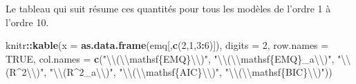 \documentclass[
]{book}
\newenvironment{Shaded}{\begin{snugshade}}{\end{snugshade}}
\newcommand{\CharTok}[1]{\textcolor[rgb]{0.31,0.60,0.02}{#1}}
\newcommand{\DataTypeTok}[1]{\textcolor[rgb]{0.13,0.29,0.53}{#1}}
\newcommand{\DecValTok}[1]{\textcolor[rgb]{0.00,0.00,0.81}{#1}}
\newcommand{\KeywordTok}[1]{\textcolor[rgb]{0.13,0.29,0.53}{\textbf{#1}}}
\newcommand{\NormalTok}[1]{#1}
\newcommand{\OperatorTok}[1]{\textcolor[rgb]{0.81,0.36,0.00}{\textbf{#1}}}
\newcommand{\OtherTok}[1]{\textcolor[rgb]{0.56,0.35,0.01}{#1}}
\newcommand{\StringTok}[1]{\textcolor[rgb]{0.31,0.60,0.02}{#1}}
\theoremstyle{definition}
\theoremstyle{definition}
\theoremstyle{definition}
\theoremstyle{remark}
\begin{document}
Le tableau qui suit résume ces quantités pour tous les modèles de l'ordre 1 à l'ordre 10.

\begin{Shaded}
\begin{Highlighting}[]
\NormalTok{knitr}\OperatorTok{::}\KeywordTok{kable}\NormalTok{(}\DataTypeTok{x =} \KeywordTok{as.data.frame}\NormalTok{(emq[,}\KeywordTok{c}\NormalTok{(}\DecValTok{2}\NormalTok{,}\DecValTok{1}\NormalTok{,}\DecValTok{3}\OperatorTok{:}\DecValTok{6}\NormalTok{)]), }
             \DataTypeTok{digits =} \DecValTok{2}\NormalTok{, }
             \DataTypeTok{row.names =} \OtherTok{TRUE}\NormalTok{,}
            \DataTypeTok{col.names =} \KeywordTok{c}\NormalTok{(}\StringTok{"}\CharTok{\textbackslash{}\textbackslash{}}\StringTok{(}\CharTok{\textbackslash{}\textbackslash{}}\StringTok{mathsf\{EMQ\}}\CharTok{\textbackslash{}\textbackslash{}}\StringTok{)"}\NormalTok{,}
                          \StringTok{"}\CharTok{\textbackslash{}\textbackslash{}}\StringTok{(}\CharTok{\textbackslash{}\textbackslash{}}\StringTok{mathsf\{EMQ\}_a}\CharTok{\textbackslash{}\textbackslash{}}\StringTok{)"}\NormalTok{,}
                          \StringTok{"}\CharTok{\textbackslash{}\textbackslash{}}\StringTok{(R^2}\CharTok{\textbackslash{}\textbackslash{}}\StringTok{)"}\NormalTok{, }\StringTok{"}\CharTok{\textbackslash{}\textbackslash{}}\StringTok{(R^2_a}\CharTok{\textbackslash{}\textbackslash{}}\StringTok{)"}\NormalTok{,}
                          \StringTok{"}\CharTok{\textbackslash{}\textbackslash{}}\StringTok{(}\CharTok{\textbackslash{}\textbackslash{}}\StringTok{mathsf\{AIC\}}\CharTok{\textbackslash{}\textbackslash{}}\StringTok{)"}\NormalTok{, }\StringTok{"}\CharTok{\textbackslash{}\textbackslash{}}\StringTok{(}\CharTok{\textbackslash{}\textbackslash{}}\StringTok{mathsf\{BIC\}}\CharTok{\textbackslash{}\textbackslash{}}\StringTok{)"}\NormalTok{))}
\end{Highlighting}
\end{Shaded}
\end{document}
